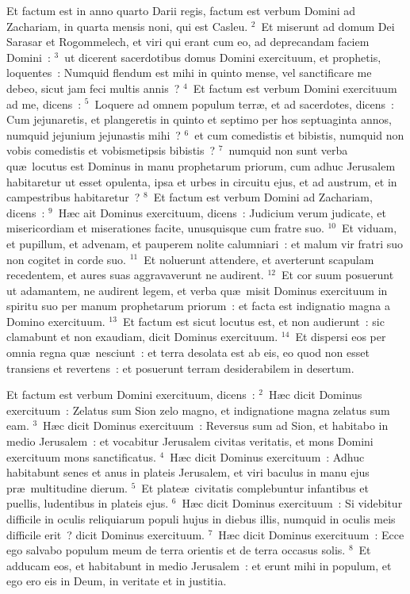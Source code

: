 \bchapter
\lettrine[lines=3,image=true,loversize=0.05,lraise=-0.03]{E}{}t factum est in anno quarto Darii regis, factum est verbum Domini ad Zachariam, in quarta mensis noni, qui est Casleu.
${}^{2}$~Et miserunt ad domum Dei Sarasar et Rogommelech, et viri qui erant cum eo, ad deprecandam faciem Domini~:
${}^{3}$~ut dicerent sacerdotibus domus Domini exercituum, et prophetis, loquentes~: Numquid flendum est mihi in quinto mense, vel sanctificare me debeo, sicut jam feci multis annis~?
${}^{4}$~Et factum est verbum Domini exercituum ad me, dicens~:
${}^{5}$~Loquere ad omnem populum terr\ae , et ad sacerdotes, dicens~: Cum jejunaretis, et plangeretis in quinto et septimo per hos septuaginta annos, numquid jejunium jejunastis mihi~?
${}^{6}$~et cum comedistis et bibistis, numquid non vobis comedistis et vobismetipsis bibistis~?
${}^{7}$~numquid non sunt verba qu\ae\ locutus est Dominus in manu prophetarum priorum, cum adhuc Jerusalem habitaretur ut esset opulenta, ipsa et urbes in circuitu ejus, et ad austrum, et in campestribus habitaretur~?
${}^{8}$~Et factum est verbum Domini ad Zachariam, dicens~:
${}^{9}$~H\ae c ait Dominus exercituum, dicens~: Judicium verum judicate, et misericordiam et miserationes facite, unusquisque cum fratre suo.
${}^{10}$~Et viduam, et pupillum, et advenam, et pauperem nolite calumniari~: et malum vir fratri suo non cogitet in corde suo.
${}^{11}$~Et noluerunt attendere, et averterunt scapulam recedentem, et aures suas aggravaverunt ne audirent.
${}^{12}$~Et cor suum posuerunt ut adamantem, ne audirent legem, et verba qu\ae\ misit Dominus exercituum in spiritu suo per manum prophetarum priorum~: et facta est indignatio magna a Domino exercituum.
${}^{13}$~Et factum est sicut locutus est, et non audierunt~: sic clamabunt et non exaudiam, dicit Dominus exercituum.
${}^{14}$~Et dispersi eos per omnia regna qu\ae\ nesciunt~: et terra desolata est ab eis, eo quod non esset transiens et revertens~: et posuerunt terram desiderabilem in desertum.

\bchapter
\lettrine[lines=3,image=true,loversize=0.05,lraise=-0.03]{E}{}t factum est verbum Domini exercituum, dicens~:
${}^{2}$~H\ae c dicit Dominus exercituum~: Zelatus sum Sion zelo magno, et indignatione magna zelatus sum eam.
${}^{3}$~H\ae c dicit Dominus exercituum~: Reversus sum ad Sion, et habitabo in medio Jerusalem~: et vocabitur Jerusalem civitas veritatis, et mons Domini exercituum mons sanctificatus.
${}^{4}$~H\ae c dicit Dominus exercituum~: Adhuc habitabunt senes et anus in plateis Jerusalem, et viri baculus in manu ejus pr\ae\ multitudine dierum.
${}^{5}$~Et plate\ae\ civitatis complebuntur infantibus et puellis, ludentibus in plateis ejus.
${}^{6}$~H\ae c dicit Dominus exercituum~: Si videbitur difficile in oculis reliquiarum populi hujus in diebus illis, numquid in oculis meis difficile erit~? dicit Dominus exercituum.
${}^{7}$~H\ae c dicit Dominus exercituum~: Ecce ego salvabo populum meum de terra orientis et de terra occasus solis.
${}^{8}$~Et adducam eos, et habitabunt in medio Jerusalem~: et erunt mihi in populum, et ego ero eis in Deum, in veritate et in justitia.


